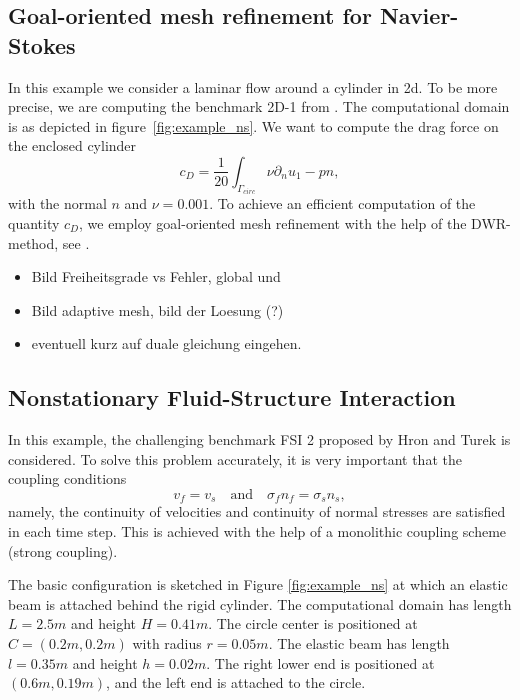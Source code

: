 \documentclass[prodmode,acmtoms]{acmsmall}
\numberwithin{equation}{section}
\begin{document}
\subsection{Goal-oriented mesh refinement for Navier-Stokes}
In this example we consider a laminar flow around a cylinder in 2d. To be more precise, we are computing the benchmark 2D-1 from \cite{TuSchae96}. The computational domain is as depicted in figure~\ref{fig:example_ns}. We want to compute the drag force on the enclosed cylinder
\begin{equation}
c_D = \frac 1 {20} \int_{\Gamma_{circ}} \nu\partial_nu _1 - pn,
\end{equation}
with the normal $n$ and $\nu = 0.001$. To achieve an efficient computation of the quantity $c_D$, we employ goal-oriented mesh refinement with the help of the DWR-method, see \cite{BeRa96}.

\begin{itemize}
\item Bild Freiheitsgrade vs Fehler, global und 
\item Bild adaptive mesh, bild der Loesung (?)
\item eventuell kurz auf duale gleichung eingehen.
\end{itemize}

\subsection{Nonstationary Fluid-Structure Interaction}
In this example, the challenging benchmark FSI 2
proposed by Hron and Turek \cite{HrTu06b} is considered.
To solve this problem accurately, it is very important that 
the coupling conditions
\[
v_f = v_s \quad \text{and} \quad \sigma_f n_f = \sigma_s n_s, 
\]
namely, the continuity of velocities and continuity of normal stresses
are satisfied in each time step. This is achieved with the help of 
a monolithic coupling scheme (strong coupling).

The basic configuration is 
sketched in Figure \ref{fig:example_ns} at which an elastic beam is attached 
behind the rigid cylinder. 
The computational domain has length $L=2.5m$ and height $H=0.41m$. The circle center
is positioned at $C=(0.2m,0.2m)$ with radius $r=0.05m$. The elastic beam has length
$l=0.35m$ and height $h=0.02m$. The right lower end is positioned at 
$(0.6m,0.19m)$, and
the left end is attached to the circle. 

%
\end{document}

